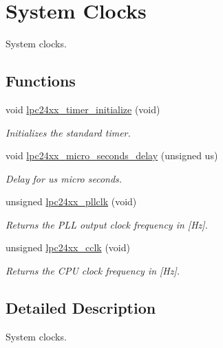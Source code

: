 \hypertarget{group__lpc24xx__clock}{}\section{System Clocks}
\label{group__lpc24xx__clock}


System clocks.  


\subsection*{Functions}
\begin{DoxyCompactItemize}
\item 
void \mbox{\hyperlink{group__lpc24xx__clock_gab3adf1ba12bf721c8229c9f473099d87}{lpc24xx\+\_\+timer\+\_\+initialize}} (void)
\begin{DoxyCompactList}\small\item\em Initializes the standard timer. \end{DoxyCompactList}\item 
void \mbox{\hyperlink{group__lpc24xx__clock_gac1fffb9076567b431b33ef1028873a78}{lpc24xx\+\_\+micro\+\_\+seconds\+\_\+delay}} (unsigned us)
\begin{DoxyCompactList}\small\item\em Delay for {\itshape us} micro seconds. \end{DoxyCompactList}\item 
unsigned \mbox{\hyperlink{group__lpc24xx__clock_ga985f11224a9ca5c881d6a7da40eb1b97}{lpc24xx\+\_\+pllclk}} (void)
\begin{DoxyCompactList}\small\item\em Returns the P\+LL output clock frequency in \mbox{[}Hz\mbox{]}. \end{DoxyCompactList}\item 
unsigned \mbox{\hyperlink{group__lpc24xx__clock_ga1f89dbcdb26c1d4fe517abf6691f3a91}{lpc24xx\+\_\+cclk}} (void)
\begin{DoxyCompactList}\small\item\em Returns the C\+PU clock frequency in \mbox{[}Hz\mbox{]}. \end{DoxyCompactList}\end{DoxyCompactItemize}


\subsection{Detailed Description}
System clocks. 



